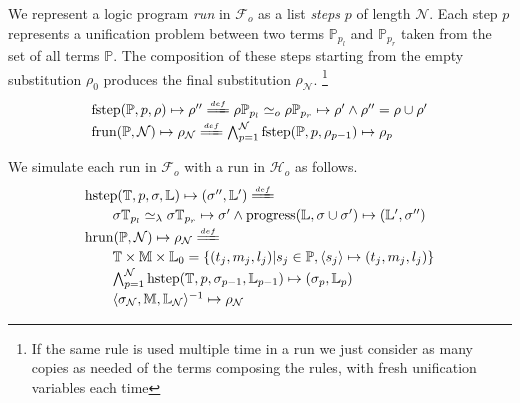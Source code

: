 \documentclass[sigconf,natbib=false,review]{acmart}
\newcommand{\UnifRel}{\ensuremath{\simeq}}
\newcommand{\Uo}{\ensuremath{\UnifRel_o}\xspace}
\newcommand{\Ue}{\ensuremath{\UnifRel_\lambda}\xspace}
\newcommand{\Fo}{\ensuremath{\mathcal{F}_{\!o}\xspace}} %
\newcommand{\Ho}{\ensuremath{\mathcal{H}_o}\xspace}
\newcommand{\linkStore}{\ensuremath{\mathbb{L}}\xspace}
\newcommand{\mapStore}{\ensuremath{\mathbb{M}}\xspace}
\newcommand{\foUnifPb}{\ensuremath{\mathbb{P}}\xspace}
\newcommand{\hoUnifPb}{\ensuremath{\mathbb{T}}\xspace}
\begin{document}
We represent a logic program \emph{run} in \Fo{} as
a list \emph{steps} $p$ of length $\mathcal{N}$.
Each step $p$ represents 
a unification problem between two terms $\foUnifPb_{p_l}$ and
$\foUnifPb_{p_r}$ taken from the set of all terms \foUnifPb.
The composition of these steps starting from the
empty substitution $\rho_0$ produces the final
substitution $\rho_\mathcal{N}$.
\footnote{If the same rule is used multiple time in a run we
just consider as many copies as needed of the terms composing the
rules, with fresh unification variables each time}
%
\newcommand{\progress}{\ensuremath{\mathrm{progress}}\xspace}
\newcommand{\fstep}{\ensuremath{\mathrm{fstep}}\xspace}
\newcommand{\hstep}{\ensuremath{\mathrm{hstep}}\xspace}
\newcommand{\frun}{\ensuremath{\mathrm{frun}}\xspace}
\newcommand{\hrun}{\ensuremath{\mathrm{hrun}}\xspace}
\newcommand{\stepF}[4]{\ensuremath{\fstep(#1,#2,#3) \mapsto #4}}
\newcommand{\stepFD}[5]{%
\ensuremath{#3 #1_{#2_l} \Uo #3 #1_{#2_r} \mapsto #4 \land #5 = #3 \cup #4}}
\newcommand{\stepH}[6]{\ensuremath{\hstep(#1,#2,#3,#4) \mapsto (#5, #6)}}
\newcommand{\stepHD}[6]{\ensuremath{%
#3 #1_{#2_l} \Ue #3 #1_{#2_r} \mapsto #4 \land \progress(#6,#3 \cup #4) \mapsto (#6',#5)}}
\newcommand{\runF}[3]{\ensuremath{\frun(#1,#2) \mapsto #3_{#2}}}
\newcommand{\runFD}[2]{\ensuremath{%
\bigwedge_{p = 1}^{#2} \stepF{#1}{p}{\rho_{p-1}}{\rho_{p}}}}
\newcommand{\runH}[3]{\ensuremath{\hrun(#1,#2) \mapsto #3_{#2}}}
\newcommand{\runHD}[3]{\ensuremath{%
\bigwedge_{p = 1}^{#2} \stepH{#1}{p}{\sigma_{p-1}}{#3_{p-1}}{\sigma_{p}}{#3_p}}}
\newcommand{\deff}{\ensuremath{\stackrel{{\scriptscriptstyle def}}{=\!=\!\!\!=}}}
%
$$
\begin{array}{l}
\stepF{\foUnifPb}{p}{\rho}{\rho''}
\deff
\stepFD{\foUnifPb}{p}{\rho}{\rho'}{\rho''}\vspace{2pt}\\
\runF{\foUnifPb}{\mathcal{N}}{\rho}
\deff
\runFD{\foUnifPb}{\mathcal{N}}
\end{array}
$$

\noindent We simulate each run in \Fo{} with a run in \Ho as follows.
$$
\begin{array}{l}
\stepH{\hoUnifPb}{p}{\sigma}{\linkStore}{\sigma''}{\linkStore'} \deff\vspace{2pt}\\
  \qquad\stepHD{\hoUnifPb}{p}{\sigma}{\sigma'}{\sigma''}{\linkStore}\vspace{2pt}\\
\runH{\foUnifPb}{\mathcal{N}}{\rho} \deff \vspace{2pt}\\
  \qquad \hoUnifPb \times \mapStore \times \linkStore_0 = \{ (t_j,m_j,l_j) | s_j \in \foUnifPb, \C{s_j}{t_j}{m_j}{l_j} \}\vspace{2pt}\\
  \qquad \runHD{\hoUnifPb}{\mathcal{N}}{\linkStore}\vspace{2pt}\\
  \qquad \D{\sigma_{\mathcal{N}}}{\mapStore}{\linkStore_{\mathcal{N}}}{\rho_{\mathcal{N}}}
\end{array}
$$
\end{document}
